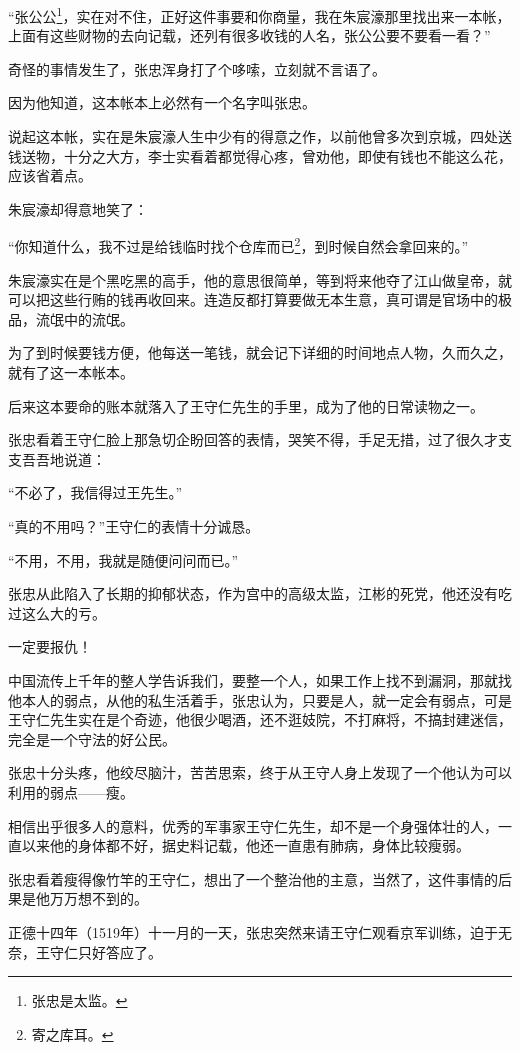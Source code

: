 \begin{multicols}{\theparacolNo}
“张公公\footnote{张忠是太监。}，实在对不住，正好这件事要和你商量，我在朱宸濠那里找出来一本帐，上面有这些财物的去向记载，还列有很多收钱的人名，张公公要不要看一看？”

奇怪的事情发生了，张忠浑身打了个哆嗦，立刻就不言语了。

因为他知道，这本帐本上必然有一个名字叫张忠。

说起这本帐，实在是朱宸濠人生中少有的得意之作，以前他曾多次到京城，四处送钱送物，十分之大方，李士实看着都觉得心疼，曾劝他，即使有钱也不能这么花，应该省着点。

朱宸濠却得意地笑了：

“你知道什么，我不过是给钱临时找个仓库而已\footnote{寄之库耳。}，到时候自然会拿回来的。”

朱宸濠实在是个黑吃黑的高手，他的意思很简单，等到将来他夺了江山做皇帝，就可以把这些行贿的钱再收回来。连造反都打算要做无本生意，真可谓是官场中的极品，流氓中的流氓。

为了到时候要钱方便，他每送一笔钱，就会记下详细的时间地点人物，久而久之，就有了这一本帐本。

后来这本要命的账本就落入了王守仁先生的手里，成为了他的日常读物之一。

张忠看着王守仁脸上那急切企盼回答的表情，哭笑不得，手足无措，过了很久才支支吾吾地说道：

“不必了，我信得过王先生。”

“真的不用吗？”王守仁的表情十分诚恳。

“不用，不用，我就是随便问问而已。”

张忠从此陷入了长期的抑郁状态，作为宫中的高级太监，江彬的死党，他还没有吃过这么大的亏。

一定要报仇！

中国流传上千年的整人学告诉我们，要整一个人，如果工作上找不到漏洞，那就找他本人的弱点，从他的私生活着手，张忠认为，只要是人，就一定会有弱点，可是王守仁先生实在是个奇迹，他很少喝酒，还不逛妓院，不打麻将，不搞封建迷信，完全是一个守法的好公民。

张忠十分头疼，他绞尽脑汁，苦苦思索，终于从王守人身上发现了一个他认为可以利用的弱点——瘦。

相信出乎很多人的意料，优秀的军事家王守仁先生，却不是一个身强体壮的人，一直以来他的身体都不好，据史料记载，他还一直患有肺病，身体比较瘦弱。

张忠看着瘦得像竹竿的王守仁，想出了一个整治他的主意，当然了，这件事情的后果是他万万想不到的。

正德十四年（1519年）十一月的一天，张忠突然来请王守仁观看京军训练，迫于无奈，王守仁只好答应了。


\end{multicols}
